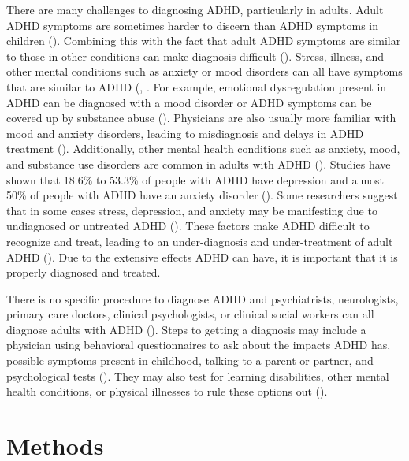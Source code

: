 \documentclass[,article,submit,moreauthors,pdftex]{mdpi}
\begin{document}
There are many challenges to diagnosing ADHD, particularly in adults.
Adult ADHD symptoms are sometimes harder to discern than ADHD symptoms
in children (\citet{noauthor_adult_nodate}). Combining this with the
fact that adult ADHD symptoms are similar to those in other conditions
can make diagnosis difficult (\citet{noauthor_adult_nodate}). Stress,
illness, and other mental conditions such as anxiety or mood disorders
can all have symptoms that are similar to ADHD
(\citet{noauthor_adult_nodate},
\citet{noauthor_attention-deficithyperactivity_nodate2}. For example,
emotional dysregulation present in ADHD can be diagnosed with a mood
disorder or ADHD symptoms can be covered up by substance abuse
(\citet{pmid28830387}). Physicians are also usually more familiar with
mood and anxiety disorders, leading to misdiagnosis and delays in ADHD
treatment (\citet{pmid28830387}). Additionally, other mental health
conditions such as anxiety, mood, and substance use disorders are common
in adults with ADHD
(\citet{noauthor_attention-deficithyperactivity_nodate2}). Studies have
shown that 18.6\% to 53.3\% of people with ADHD have depression and
almost 50\% of people with ADHD have an anxiety disorder
(\citet{pmid28830387}). Some researchers suggest that in some cases
stress, depression, and anxiety may be manifesting due to undiagnosed or
untreated ADHD (\citet{pmid28830387}). These factors make ADHD difficult
to recognize and treat, leading to an under-diagnosis and
under-treatment of adult ADHD (\citet{pmid28830387}). Due to the
extensive effects ADHD can have, it is important that it is properly
diagnosed and treated.

There is no specific procedure to diagnose ADHD and psychiatrists,
neurologists, primary care doctors, clinical psychologists, or clinical
social workers can all diagnose adults with ADHD
(\citet{contributors_diagnosing_nodate}). Steps to getting a diagnosis
may include a physician using behavioral questionnaires to ask about the
impacts ADHD has, possible symptoms present in childhood, talking to a
parent or partner, and psychological tests
(\citet{contributors_diagnosing_nodate}). They may also test for
learning disabilities, other mental health conditions, or physical
illnesses to rule these options out
(\citet{contributors_diagnosing_nodate}).

\hypertarget{methods}{%
\section{Methods}\label{methods}}
\end{document}
